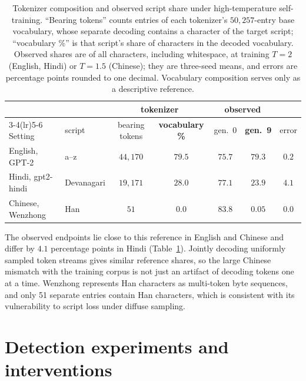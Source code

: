 \documentclass[10pt]{article}
\theoremstyle{plain}
\theoremstyle{definition}
\begin{document}
\begin{table}[ht]
\centering\small
\caption{Tokenizer composition and observed script share under high-temperature self-training.
``Bearing tokens'' counts entries of each tokenizer's $50{,}257$-entry base vocabulary, whose separate decoding contains
a character of the target script; ``vocabulary \%'' is that script's share of characters in the
decoded vocabulary. Observed shares are of all characters, including whitespace, at training $T=2$
(English, Hindi) or $T=1.5$ (Chinese); they are three-seed means, and errors are percentage
points rounded to one decimal. Vocabulary composition serves only as a descriptive reference.}
\label{tab:vocabdrift}
\begin{tabular}{llccccc}
\toprule
 & & \multicolumn{2}{c}{tokenizer} & \multicolumn{2}{c}{observed} & \\
\cmidrule(lr){3-4}\cmidrule(lr){5-6}
Setting & script & bearing tokens & \textbf{vocabulary \%} & gen.~0 & \textbf{gen.~9} & error \\
\midrule
English, GPT-2 & a--z & $44{,}170$ & $79.5$ & $75.7$ & $\mathbf{79.3}$ & $0.2$ \\
Hindi, gpt2-hindi & Devanagari & $19{,}171$ & $28.0$ & $77.1$ & $\mathbf{23.9}$ & $4.1$ \\
Chinese, Wenzhong & Han & $51$ & $0.0$ & $83.8$ & $\mathbf{0.05}$ & $0.0$ \\
\bottomrule
\end{tabular}
\end{table}

The observed endpoints lie close to this reference in English and Chinese and differ by $4.1$
percentage points in Hindi (Table~\ref{tab:vocabdrift}). Jointly decoding uniformly sampled token
streams gives similar reference shares, so the large
Chinese mismatch with the training corpus is not just an artifact of decoding tokens one at a
time. Wenzhong represents Han characters as multi-token byte sequences, and only 51 separate
entries contain Han characters, which is consistent with its
vulnerability to script loss under diffuse sampling.

\section{Detection experiments and interventions}
\label{app:detect}
\end{document}
